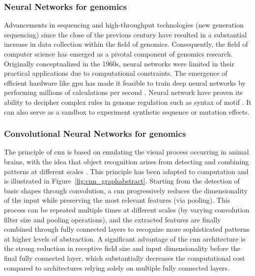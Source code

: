 \documentclass[11pt]{book}
\begin{document}
\subsubsection{Neural Networks for genomics}
Advancements in sequencing and high-throughput technologies (new generation sequencing) since the close of the previous century have resulted in a substantial increase in data collection within the field of genomics. Consequently, the field of computer science has emerged as a pivotal component of genomics research. Originally conceptualized in the 1960s, neural networks were limited in their practical applications due to computational constraints. The emergence of efficient hardware like \gls{gpu} has made it feasible to train deep neural networks by performing millions of calculations per second \cite{simard_gpu_2005}.
Neural network have proven its ability to decipher complex rules in genome regulation such as syntax of motif \cite{avsec_base-resolution_2021}. It can also serve as a sandbox to experiment synthetic sequence or mutation effects.

\subsubsection{Convolutional Neural Networks for genomics}
The principle of \gls{cnn} is based on emulating the visual process occurring in animal brains, with the idea that object recognition arises from detecting and combining patterns at different scales \cite{hubel_receptive_1968, fukushima_neocognitron_1980}. This principle has been adapted to computation and is illustrated in Figure~\ref{fig:cnn_graphabstract}. Starting from the detection of basic shapes through convolution, a \gls{cnn} progressively reduces the dimensionality of the input while preserving the most relevant features (via pooling). This process can be repeated multiple times at different scales (by varying convolution filter size and pooling operations), and the extracted features are finally combined through fully connected layers to recognize more sophisticated patterns at higher levels of abstraction. A significant advantage of the \gls{cnn} architecture is the strong reduction in receptive field size and input dimensionality before the final fully connected layer, which substantially decreases the computational cost compared to architectures relying solely on multiple fully connected layers.
\end{document}
